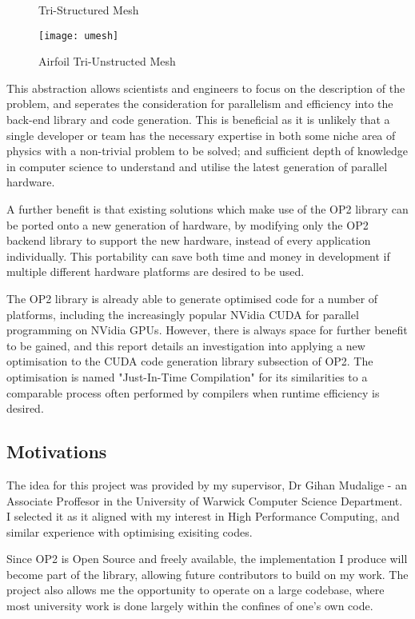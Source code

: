 \begin{figure}[h!]
  \begin{minipage}{.5\textwidth}
    \centering
    \caption{Tri-Structured Mesh}
    \label{fig:struct}
  \end{minipage}
  \begin{minipage}{.5\textwidth}
    \centering
    \texttt{[image: umesh]}
    \caption{Airfoil Tri-Unstructed Mesh}
    \label{fig:umesh}
  \end{minipage}
\end{figure}
\par
This abstraction allows scientists and engineers to focus on the description of the problem, and seperates the consideration for parallelism and efficiency into the back-end library and code generation.
This is beneficial as it is unlikely that a single developer or team has the necessary expertise in both some niche area of physics with a non-trivial problem to be solved; and sufficient depth of knowledge in computer science to understand and utilise the latest generation of parallel hardware.
\par
A further benefit is that existing solutions which make use of the OP2 library can be ported onto a new generation of hardware, by modifying only the OP2 backend library to support the new hardware, instead of every application individually. This portability can save both time and money in development if multiple different hardware platforms are desired to be used.
\par
The OP2 library is already able to generate optimised code for a number of platforms, including the increasingly popular NVidia CUDA for parallel programming on NVidia GPUs. However, there is always space for further benefit to be gained, and this report details an investigation into applying a new optimisation to the CUDA code generation library subsection of OP2. The optimisation is named "Just-In-Time Compilation" for its similarities to a comparable process often performed by compilers when runtime efficiency is desired.

\subsection{Motivations}
The idea for this project was provided by my supervisor, Dr Gihan Mudalige - an Associate Proffesor in the University of Warwick Computer Science Department. I selected it as it aligned with my interest in High Performance Computing, and similar experience with optimising exisiting codes.
\par
Since OP2 is Open Source and freely available, the implementation I produce will become part of the library, allowing future contributors to build on my work. The project also allows me the opportunity to operate on a large codebase, where most university work is done largely within the confines of one's own code.
